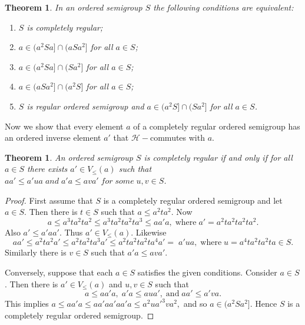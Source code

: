 \documentclass[13pt]{article}
\newtheorem{Theorem}[theorem]{Theorem}
\theoremstyle{definition}
\theoremstyle{remark}
\numberwithin{equation}{section}
\newcommand{\hc}{\mathcal{H}}
\begin{document}
\begin{Theorem}\label{cr10}
In an ordered semigroup $S$ the following conditions are equivalent:
\begin{enumerate}
  \item \vspace{-.4cm}
   $S$ is completely regular;
   \item \vspace{-.4cm}
    $a \in (a^{2} S a] \cap (a Sa^{2}]$ for all $a \in S$;
    \item \vspace{-.4cm}
    $a \in (a^{2} S a] \cap (Sa^{2}]$ for all $a \in S$;
   \item \vspace{-.4cm}
   $a \in (aSa^{2}] \cap (a^{2}S]$ for all $a \in S$;
  \item \vspace{-.4cm}
   $S$ is regular ordered  semigroup and $a \in (a^{2}S] \cap (Sa^{2}]$ for all $a \in
   S$.
\end{enumerate}
\end{Theorem}
Now we show that every element $a$ of a completely regular ordered
semigroup has an ordered inverse element $a'$ that $\hc-$commutes
with $a$.
\begin{Theorem}\label{cr11}
An ordered semigroup $S$ is  completely regular if and only if for
all $a \in S$ there exists $a' \in V_{\leq}(a)$ such that $aa' \leq
a'ua \;and \;a'a \leq ava' \;for \;some  \;u, v \in S$.
\end{Theorem}
\begin{proof}
First assume that $S$ is a completely regular ordered semigroup and
let $a \in S $. Then there is $ t \in S$ such that $a \leq a^2ta^2$.
Now $$ a  \leq a^3ta^2ta^2 \leq  a^3ta^2ta^2ta^3 \leq aa'a,
\;\textrm{where} \;a'= a^2 ta^2 ta^2 ta^2.$$ Also $a' \leq a'aa'$.
Thus $a' \in  V_{\leq}(a)$.  Likewise
$$ aa'\leq a^2 ta^2a' \leq a^2ta^2 ta^3a' \leq a^2 ta^2 ta^2ta^4 a'= \;a'ua, \;\textrm{where} \;u=a^4 ta^2
ta^2 ta \in S.$$ Similarly there is $v \in S$ such that $a'a \leq
ava'$.

Conversely, suppose that each $a \in S$ satisfies the given
conditions. Consider $a \in S$. Then there  is $a' \in V_{\leq}(a)$
 and $ u, v \in S$ such that $$a \leq aa'a, \;a'a \leq aua', \;\textrm{and} \;aa'
\leq a'va.$$ This implies $a \leq aa'a \leq a a'a a' aa'a \leq a^2u
a'^3 va^2,$ and so $a \in (a^2 S a^2]$. Hence $S$ is a completely
regular ordered semigroup.
\end{proof}
\end{document}
